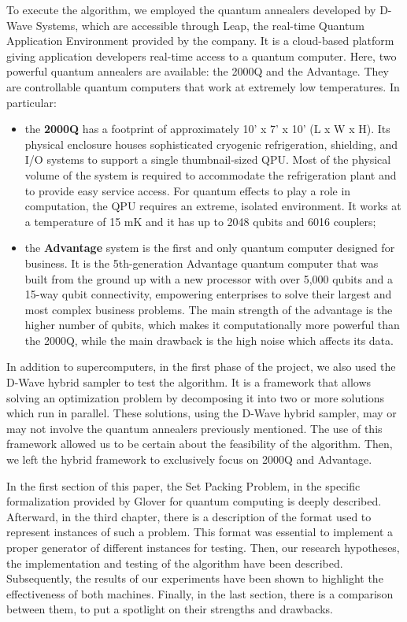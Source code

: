 \documentclass[oneside,a4paper]{article}
\begin{document}
To execute the algorithm, we employed the quantum annealers developed by D-Wave Systems, \cite{WebSite1} which are accessible through Leap, the real-time Quantum Application Environment provided by the company. It is a cloud-based platform giving application developers real-time access to a quantum computer. Here, two powerful quantum annealers are available: the 2000Q and the Advantage. They are controllable quantum computers that work at extremely low temperatures. In particular:
\begin{itemize}
    \item the \textbf{2000Q} has a footprint of approximately 10' x 7' x 10' (L x W x H). Its physical enclosure houses sophisticated cryogenic refrigeration, shielding, and I/O systems to support a single thumbnail-sized QPU.  Most of the physical volume of the system is required to accommodate the refrigeration plant and to provide easy service access.  For quantum effects to play a role in computation, the QPU requires an extreme, isolated environment. It works at a temperature of 15 mK and it has up to 2048 qubits and 6016 couplers;
    \item the \textbf{Advantage} system is the first and only quantum computer designed for business. It is the 5th-generation Advantage quantum computer that was built from the ground up with a new processor with over 5,000 qubits and a 15-way qubit connectivity, empowering enterprises to solve their largest and most complex business problems. The main strength of the advantage is the higher number of qubits, which makes it computationally more powerful than the 2000Q, while the main drawback is the high noise which affects its data.
\end{itemize}
In addition to supercomputers, in the first phase of the project, we also used the D-Wave hybrid sampler \cite{WebSite6} to test the algorithm. It is a framework that allows solving an optimization problem by decomposing it into two or more solutions which run in parallel. These solutions, using the D-Wave hybrid sampler, may or may not involve the quantum annealers previously mentioned. The use of this framework allowed us to be certain about the feasibility of the algorithm. Then, we left the hybrid framework to exclusively focus on 2000Q and Advantage.

In the first section of this paper, the Set Packing Problem, in the specific formalization provided by Glover for quantum computing\cite{article1} is deeply described. Afterward, in the third chapter, there is a description of the format used to represent instances of such a problem. This format was essential to implement a proper  generator of different instances for testing. Then, our research hypotheses, the implementation and testing of the algorithm have been described. Subsequently, the results of our experiments have been shown to highlight the effectiveness of both machines. Finally, in the last section, there is a comparison between them, to put a spotlight on their strengths and drawbacks.
\end{document}
